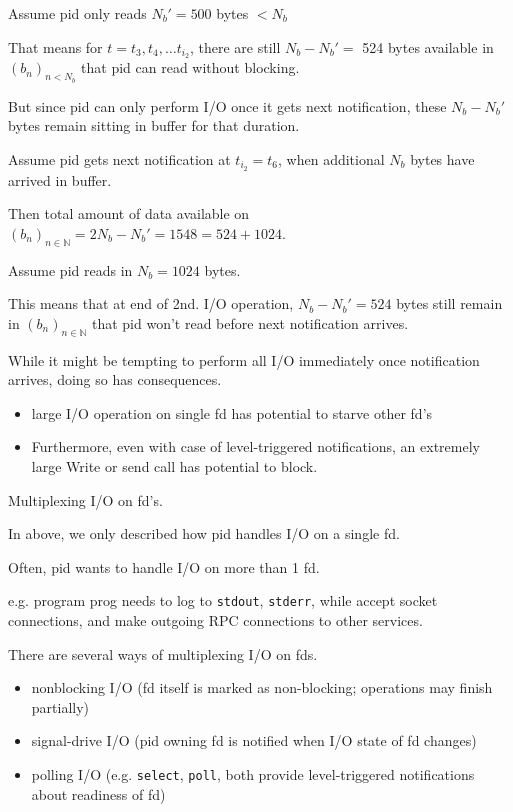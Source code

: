 \documentclass[10pt]{amsart}
\begin{document}
Assume pid only reads $N_b' = 500$ bytes $<N_b$

That means for $t=t_3, t_4, \dots t_{i_2}$, there are still $N_b - N_b' = $ 524 bytes available in $(b_n)_{n < N_b}$ that pid can read without blocking.

But since pid can only perform I/O once it gets next notification, these $N_b - N_b'$ bytes remain sitting in buffer for that duration.

Assume pid gets next notification at $t_{i_2} = t_6$, when additional $N_b$ bytes have arrived in buffer.

Then total amount of data available on $(b_n)_{n\in \mathbb{N}} = 2N_b - N_b' = 1548 = 524 + 1024$.

Assume pid reads in $N_b = 1024$ bytes.

This means that at end of 2nd. I/O operation, $N_b - N_b' = 524$ bytes still remain in $(b_n)_{n\in \mathbb{N}}$ that pid won't read before next notification arrives.

While it might be tempting to perform all I/O immediately once notification arrives, doing so has consequences. 
\begin{itemize}
	\item large I/O operation on single fd has potential to starve other fd's 
	\item Furthermore, even with case of level-triggered notifications, an extremely large Write or send call has potential to block.
\end{itemize}

Multiplexing I/O on fd's.

In above, we only described how pid handles I/O on a single fd.

Often, pid wants to handle I/O on more than 1 fd.

e.g. program prog needs to log to \texttt{stdout}, \texttt{stderr}, while accept socket connections, and make outgoing RPC connections to other services. 

There are several ways of multiplexing I/O on fds.
\begin{itemize}
	\item nonblocking I/O (fd itself is marked as non-blocking; operations may finish partially)
	\item signal-drive I/O (pid owning fd is notified when I/O state of fd changes)
	\item polling I/O (e.g. \texttt{select}, \texttt{poll}, both provide level-triggered notifications about readiness of fd)
\end{itemize}
\end{document}
